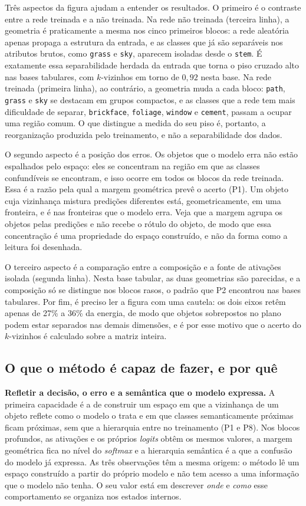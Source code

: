 Três aspectos da figura ajudam a entender os resultados. O primeiro é o contraste entre a rede treinada e a não treinada. Na rede não treinada (terceira linha), a geometria é praticamente a mesma nos cinco primeiros blocos: a rede aleatória apenas propaga a estrutura da entrada, e as classes que já são separáveis nos atributos brutos, como \texttt{grass} e \texttt{sky}, aparecem isoladas desde o \texttt{stem}. É exatamente essa separabilidade herdada da entrada que torna o piso cruzado alto nas bases tabulares, com $k$-vizinhos em torno de $0{,}92$ nesta base. Na rede treinada (primeira linha), ao contrário, a geometria muda a cada bloco: \texttt{path}, \texttt{grass} e \texttt{sky} se destacam em grupos compactos, e as classes que a rede tem mais dificuldade de separar, \texttt{brickface}, \texttt{foliage}, \texttt{window} e \texttt{cement}, passam a ocupar uma região comum. O que distingue a medida do seu piso é, portanto, a reorganização produzida pelo treinamento, e não a separabilidade dos dados.

O segundo aspecto é a posição dos erros. Os objetos que o modelo erra não estão espalhados pelo espaço: eles se concentram na região em que as classes confundíveis se encontram, e isso ocorre em todos os blocos da rede treinada. Essa é a razão pela qual a margem geométrica prevê o acerto (P1). Um objeto cuja vizinhança mistura predições diferentes está, geometricamente, em uma fronteira, e é nas fronteiras que o modelo erra. Veja que a margem agrupa os objetos pelas predições e não recebe o rótulo do objeto, de modo que essa concentração é uma propriedade do espaço construído, e não da forma como a leitura foi desenhada.

O terceiro aspecto é a comparação entre a composição e a fonte de ativações isolada (segunda linha). Nesta base tabular, as duas geometrias são parecidas, e a composição só se distingue nos blocos rasos, o padrão que P2 encontrou nas bases tabulares. Por fim, é preciso ler a figura com uma cautela: os dois eixos retêm apenas de 27\% a 36\% da energia, de modo que objetos sobrepostos no plano podem estar separados nas demais dimensões, e é por esse motivo que o acerto do $k$-vizinhos é calculado sobre a matriz inteira.

\subsection{O que o método é capaz de fazer, e por quê}\label{subsec:res_instanciacao}

\textbf{Refletir a decisão, o erro e a semântica que o modelo expressa.} A primeira capacidade é a de construir um espaço em que a vizinhança de um objeto reflete como o modelo o trata e em que classes semanticamente próximas ficam próximas, sem que a hierarquia entre no treinamento (P1 e P8). Nos blocos profundos, as ativações e os próprios \textit{logits} obtêm os mesmos valores, a margem geométrica fica no nível do \textit{softmax} e a hierarquia semântica é a que a confusão do modelo já expressa. As três observações têm a mesma origem: o método lê um espaço construído a partir do próprio modelo e não tem acesso a uma informação que o modelo não tenha. O seu valor está em descrever \textit{onde} e \textit{como} esse comportamento se organiza nos estados internos.

